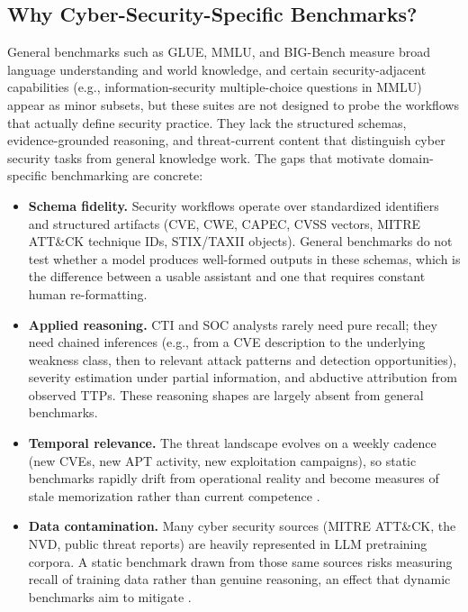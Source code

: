 \documentclass[unnumsec,webpdf,contemporary,large]{oup-authoring-template}
\theoremstyle{thmstyleone}
\theoremstyle{thmstyletwo}
\theoremstyle{thmstylethree}
\begin{document}
\subsection{Why Cyber-Security-Specific Benchmarks?}

General benchmarks such as GLUE, MMLU, and BIG-Bench measure broad language understanding and world knowledge, and certain security-adjacent capabilities (e.g., information-security multiple-choice questions in MMLU) appear as minor subsets, but these suites are not designed to probe the workflows that actually define security practice. They lack the structured schemas, evidence-grounded reasoning, and threat-current content that distinguish cyber security tasks from general knowledge work. The gaps that motivate domain-specific benchmarking are concrete:

\begin{itemize}
  \item \textbf{Schema fidelity.} Security workflows operate over standardized identifiers and structured artifacts (CVE, CWE, CAPEC, CVSS vectors, MITRE ATT\&CK technique IDs, STIX/TAXII objects). General benchmarks do not test whether a model produces well-formed outputs in these schemas, which is the difference between a usable assistant and one that requires constant human re-formatting.
  \item \textbf{Applied reasoning.} CTI and SOC analysts rarely need pure recall; they need chained inferences (e.g., from a CVE description to the underlying weakness class, then to relevant attack patterns and detection opportunities), severity estimation under partial information, and abductive attribution from observed TTPs. These reasoning shapes are largely absent from general benchmarks.
  \item \textbf{Temporal relevance.} The threat landscape evolves on a weekly cadence (new CVEs, new APT activity, new exploitation campaigns), so static benchmarks rapidly drift from operational reality and become measures of stale memorization rather than current competence \cite{alam2025athenabench}.
  \item \textbf{Data contamination.} Many cyber security sources (MITRE ATT\&CK, the NVD, public threat reports) are heavily represented in LLM pretraining corpora. A static benchmark drawn from those same sources risks measuring recall of training data rather than genuine reasoning, an effect that dynamic benchmarks aim to mitigate \cite{alam2025athenabench}.
\end{itemize}
\end{document}
